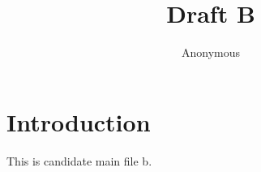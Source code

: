 \documentclass{article}
\title{Draft B}
\author{Anonymous}
\begin{document}
\maketitle

\section{Introduction}
This is candidate main file b.
\end{document}
